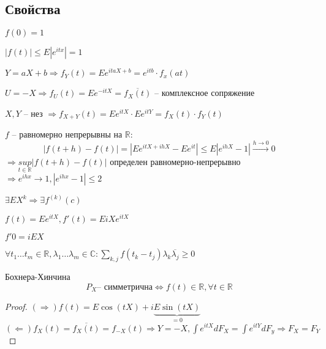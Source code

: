 \documentclass{article}
\begin{document}
    \subsection{Свойства}
    \begin{property}
        $f(0) = 1$
    \end{property}
    \begin{property}
        $|f(t)| \le E|e^{itx}| = 1$
    \end{property}
    \begin{property}
        $Y = aX + b \Rightarrow f_Y(t) = Ee^{itaX + b} = e^{itb} \cdot f_x(at)$
    \end{property}
    \begin{property}
        $U = -X \Rightarrow f_U(t) = Ee^{-itX} = \overline{f_X(t)}$ -- комплексное сопряжение
    \end{property}
    \begin{property}
        $X, Y$ -- нез $\Rightarrow f_{X+Y}(t) = Ee^{itX} \cdot Ee^{itY} = f_X(t) \cdot f_Y(t)$
    \end{property}
    \begin{property}
        $f$ -- равномерно непрерывны на $\mathbb{R}:$ 
        $$| f(t+h) - f(t)| =  |Ee^{itX + ihX} - Ee^{it}| \le E|e^{ihX} - 1| \xrightarrow{h \to 0} 0 $$
        $\Rightarrow \underset{t \in \mathbb R}{sup} | f(t+h) - f(t)| $ определен равномерно-непрерывно \\ 
        $\Rightarrow e^{ihx} \to 1, |e^{ihx} - 1| \le 2$
    \end{property}
    \begin{property}
        $\exists EX^k \Rightarrow \exists f^{(k)}(c) $
    \end{property}
    \begin{property}
        $f(t) = Ee^{itX}, f'(t) = EiXe^{itX}$
    \end{property}
    \begin{property}
        $f'0 = iEX$
    \end{property}
    \begin{property}
        $\forall t_1 \dots t_m \in \mathbb R, \lambda_1 \dots \lambda_m \in \mathbb C: \sum\limits_{k, j} f(t_k - t_j) \lambda_k \overline{\lambda_j} \ge 0$
    \end{property}
    \begin{theorem}{Бохнера-Хинчина}
        $$ P_X \text{-- симметрична} \Leftrightarrow f(t) \in \mathbb R, \forall t \in \mathbb R$$
        \begin{proof}
            $(\Rightarrow) f(t) = E\cos(tX) + i \underbrace{E \sin(tX)}_{=0}$\\
            $(\Leftarrow) f_X(t) = \overline{f_X(t)} = f_{-X}(t) \Rightarrow Y=-X, \int e^{itX}dF_X = \int e^{itY} dF_y \Rightarrow F_X = F_Y $
        \end{proof}
    \end{theorem}
\end{document}
